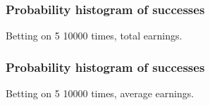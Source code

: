 \documentclass[handout]{beamer}
\begin{document}


   \begin{frame}
   \frametitle{Probability histogram of successes}
   \begin{center}
   \end{center}
   Betting on {\color{red} 5} 10000 times, total earnings.
   \end{frame}



   \begin{frame}
   \frametitle{Probability histogram of successes}
   \begin{center}
   \end{center}
   Betting on {\color{red} 5} 10000 times, average earnings.
   \end{frame}
\end{document}
